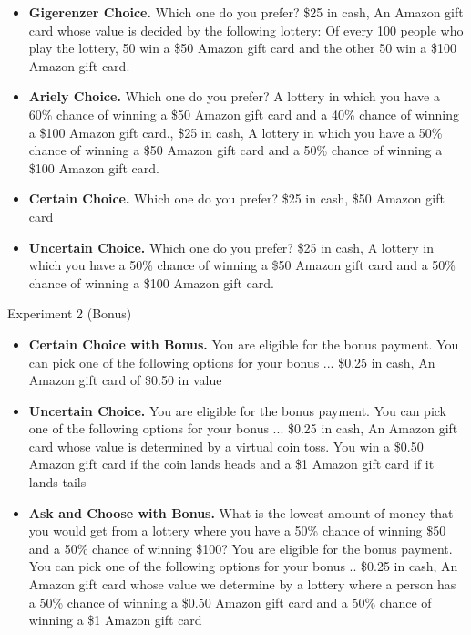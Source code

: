\documentclass[12pt, letterpaper]{article}
\begin{document}
\begin{itemize}
    \item \textbf{Gigerenzer Choice.} Which one do you prefer? \$25 in cash, An Amazon gift card whose value is decided by the following lottery: Of every 100 people who play the lottery, 50 win a \$50 Amazon gift card and the other 50 win a \$100 Amazon gift card.
    
    \item \textbf{Ariely Choice.} Which one do you prefer? A lottery in which you have a 60\% chance of winning a \$50 Amazon gift card and a 40\% chance of winning a \$100 Amazon gift card., \$25 in cash,  A lottery in which you have a 50\% chance of winning a \$50 Amazon gift card and a 50\% chance of winning a \$100 Amazon gift card.

    \item \textbf{Certain Choice.} Which one do you prefer? \$25 in cash, \$50 Amazon gift card
    
    \item \textbf{Uncertain Choice.} Which one do you prefer? \$25 in cash, A lottery in which you have a 50\% chance of winning a \$50 Amazon gift card and a 50\% chance of winning a \$100 Amazon gift card.
\end{itemize}

Experiment 2 (Bonus)

\begin{itemize}
    \item \textbf{Certain Choice with Bonus.} You are eligible for the bonus payment. You can pick one of the following options for your bonus ... \$0.25 in cash,  An Amazon gift card of \$0.50 in value

    \item \textbf{Uncertain Choice.} You are eligible for the bonus payment. You can pick one of the following options for your bonus ... \$0.25 in cash, An Amazon gift card whose value is determined by a virtual coin toss. You win a \$0.50 Amazon gift card if the coin lands heads and a \$1 Amazon gift card if it lands tails

    \item \textbf{Ask and Choose with Bonus.} What is the lowest amount of money that you would get from a lottery where you have a 50\% chance of winning \$50 and a 50\% chance of winning \$100? You are eligible for the bonus payment. You can pick one of the following options for your bonus .. \$0.25 in cash,  An Amazon gift card whose value we determine by a lottery where a person has a 50\% chance of winning a \$0.50 Amazon gift card and a 50\% chance of winning a \$1 Amazon gift card
\end{itemize}
\end{document}
